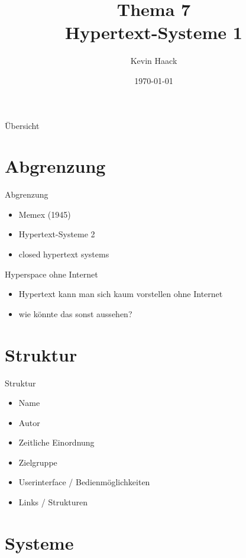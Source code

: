 \documentclass{beamer}
\title{Thema 7\\Hypertext-Systeme 1}
\author{Kevin Haack}
\institute{Universität Paderborn}
\date{\today}
\begin{document}
\begin{frame}
  \titlepage
\end{frame}

\begin{frame}{Übersicht}
\tableofcontents
\end{frame}

\section{Abgrenzung}
\begin{frame}{Abgrenzung}
	\begin{itemize}
		\item Memex (1945)
		\item Hypertext-Systeme 2
		\item closed hypertext systems
	\end{itemize}
\end{frame}

\begin{frame}{Hyperspace ohne Internet}
	\begin{itemize}
		\item Hypertext kann man sich kaum vorstellen ohne Internet
		\item wie könnte das sonst aussehen?
	\end{itemize}
\end{frame}




\section{Struktur}

\begin{frame}{Struktur}
\begin{itemize}
	\item Name
	\item Autor
	\item Zeitliche Einordnung
	\item Zielgruppe
	\item Userinterface / Bedienmöglichkeiten
	\item Links / Strukturen
\end{itemize}
\end{frame}

\section{Systeme}











\end{document}
